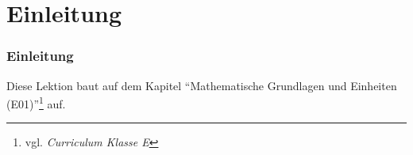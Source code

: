 

\subtitle{Technik Klasse A 01: \\
          Mathematische Grundkenntnisse \\[2em]}
\date{Stand 18.04.2016}


\section{Einleitung}

\begin{frame}
    \frametitle{Einleitung}

    Diese Lektion baut auf dem Kapitel ``Mathematische Grundlagen und Einheiten
    (E01)''\footnote{vgl. \emph{Curriculum Klasse E}\hyperlink{refs}{\cite{curr}}} auf.
   

\end{frame}
